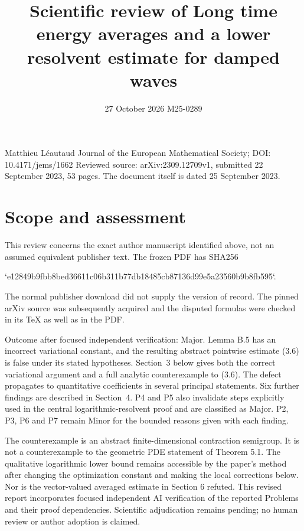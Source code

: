 \documentclass[10pt]{article}
\title{Scientific review of
Long time energy averages and a lower resolvent estimate for damped waves}
\author{}
\date{27 October 2026 M25-0289}
\begin{document}
\maketitle
Matthieu Léautaud
Journal of the European Mathematical Society; DOI: 10.4171/jems/1662
Reviewed source: arXiv:2309.12709v1, submitted 22 September 2023, 53 pages.
The document itself is dated 25 September 2023.\par
\section*{Scope and assessment}
This review concerns the exact author manuscript identified above, not an assumed equivalent publisher text. The frozen PDF has SHA256\par
`e12849b9fbb8bed36611c06b311b77db18485cb87136d99e5a23560b9b8fb595`.\par
The normal publisher download did not supply the version of record. The pinned arXiv source was subsequently acquired and the disputed formulas were checked in its TeX as well as in the PDF.\par
Outcome after focused independent verification: Major. Lemma B.5 has an incorrect variational constant, and the resulting abstract pointwise estimate (3.6) is false under its stated hypotheses. Section 3 below gives both the correct variational argument and a full analytic counterexample to (3.6). The defect propagates to quantitative coefficients in several principal statements. Six further findings are described in Section 4. P4 and P5 also invalidate steps explicitly used in the central logarithmic-resolvent proof and are classified as Major. P2, P3, P6 and P7 remain Minor for the bounded reasons given with each finding.\par
The counterexample is an abstract finite-dimensional contraction semigroup. It is not a counterexample to the geometric PDE statement of Theorem 5.1. The qualitative logarithmic lower bound remains accessible by the paper’s method after changing the optimization constant and making the local corrections below. Nor is the vector-valued averaged estimate in Section 6 refuted. This revised report incorporates focused independent AI verification of the reported Problems and their proof dependencies. Scientific adjudication remains pending; no human review or author adoption is claimed.\par
\end{document}
